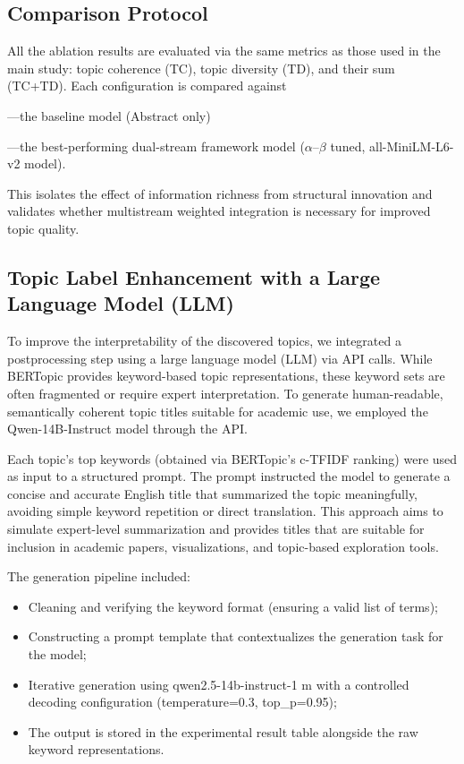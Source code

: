 \documentclass[utf8]{FrontiersinHarvard}
\begin{document}
\subsection{Comparison Protocol}
All the ablation results are evaluated via the same metrics as those used in the main study: topic coherence (TC), topic diversity (TD), and their sum (TC+TD). Each configuration is compared against

---the baseline model (Abstract only)

---the best-performing dual-stream framework model ($\alpha$--$\beta$ tuned, all-MiniLM-L6-v2 model).

This isolates the effect of information richness from structural innovation and validates whether multistream weighted integration is necessary for improved topic quality.

\subsection{Topic Label Enhancement with a Large Language Model (LLM)}

To improve the interpretability of the discovered topics, we integrated a postprocessing step using a large language model (LLM) via API calls. While BERTopic provides keyword-based topic representations, these keyword sets are often fragmented or require expert interpretation. To generate human-readable, semantically coherent topic titles suitable for academic use, we employed the Qwen-14B-Instruct model through the API.

Each topic's top keywords (obtained via BERTopic's c-TFIDF ranking) were used as input to a structured prompt. The prompt instructed the model to generate a concise and accurate English title that summarized the topic meaningfully, avoiding simple keyword repetition or direct translation. This approach aims to simulate expert-level summarization and provides titles that are suitable for inclusion in academic papers, visualizations, and topic-based exploration tools.

The generation pipeline included:

\begin{itemize}
    \item Cleaning and verifying the keyword format (ensuring a valid list of terms);
    \item Constructing a prompt template that contextualizes the generation task for the model;
    \item Iterative generation using qwen2.5-14b-instruct-1 m with a controlled decoding configuration (temperature=0.3, top\_p=0.95);
    \item The output is stored in the experimental result table alongside the raw keyword representations.
\end{itemize}
\end{document}
